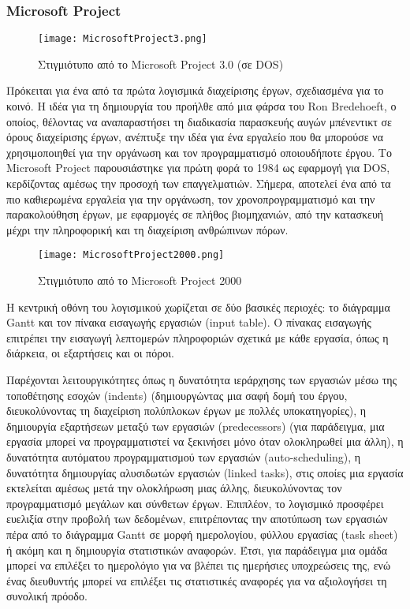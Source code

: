             \subsubsection{Microsoft Project}
                \begin{figure}[h!] \noindent \centering
                    \texttt{[image: MicrosoftProject3.png]}
                    \caption{\centering Στιγμιότυπο από το Microsoft Project 3.0 (σε DOS) \cite{WinWorld}}
                    \label{fig:MicrosoftProject3}
                \end{figure}

                Πρόκειται για ένα από τα πρώτα λογισμικά διαχείρισης έργων, σχεδιασμένα για το κοινό. Η ιδέα για τη δημιουργία του προήλθε από μια φάρσα του Ron Bredehoeft, ο οποίος, θέλοντας να αναπαραστήσει τη διαδικασία παρασκευής αυγών μπένεντικτ σε όρους διαχείρισης έργων, ανέπτυξε την ιδέα για ένα εργαλείο που θα μπορούσε να χρησιμοποιηθεί για την οργάνωση και τον προγραμματισμό οποιουδήποτε έργου. Το Microsoft Project παρουσιάστηκε για πρώτη φορά το 1984 ως εφαρμογή για DOS, κερδίζοντας αμέσως την προσοχή των επαγγελματιών. Σήμερα, αποτελεί ένα από τα πιο καθιερωμένα εργαλεία για την οργάνωση, τον χρονοπρογραμματισμό και την παρακολούθηση έργων, με εφαρμογές σε πλήθος βιομηχανιών, από την κατασκευή μέχρι την πληροφορική και τη διαχείριση ανθρώπινων πόρων.

                \begin{figure}[h!] \noindent \centering
                    \texttt{[image: MicrosoftProject2000.png]}
                    \caption{\centering Στιγμιότυπο από το Microsoft Project 2000 \cite{WinWorld}}
                    \label{fig:MicrosoftProject2000}
                \end{figure}

                Η κεντρική οθόνη του λογισμικού χωρίζεται σε δύο βασικές περιοχές: το διάγραμμα Gantt και τον πίνακα εισαγωγής εργασιών (input table). Ο πίνακας εισαγωγής επιτρέπει την εισαγωγή λεπτομερών πληροφοριών σχετικά με κάθε εργασία, όπως η διάρκεια, οι εξαρτήσεις και οι πόροι.

                Παρέχονται λειτουργικότητες όπως η δυνατότητα ιεράρχησης των εργασιών μέσω της τοποθέτησης εσοχών (indents) (δημιουργώντας μια σαφή δομή του έργου, διευκολύνοντας τη διαχείριση πολύπλοκων έργων με πολλές υποκατηγορίες), η δημιουργία εξαρτήσεων μεταξύ των εργασιών (predecessors) (για παράδειγμα, μια εργασία μπορεί να προγραμματιστεί να ξεκινήσει μόνο όταν ολοκληρωθεί μια άλλη), η δυνατότητα αυτόματου προγραμματισμού των εργασιών (auto-scheduling), η δυνατότητα δημιουργίας αλυσιδωτών εργασιών (linked tasks), στις οποίες μια εργασία εκτελείται αμέσως μετά την ολοκλήρωση μιας άλλης, διευκολύνοντας τον προγραμματισμό μεγάλων και σύνθετων έργων. Επιπλέον, το λογισμικό προσφέρει ευελιξία στην προβολή των δεδομένων, επιτρέποντας την αποτύπωση των εργασιών πέρα από το διάγραμμα Gantt σε μορφή ημερολογίου, φύλλου εργασίας (task sheet) ή ακόμη και η δημιουργία στατιστικών αναφορών. Έτσι, για παράδειγμα μια ομάδα μπορεί να επιλέξει το ημερολόγιο για να βλέπει τις ημερήσιες υποχρεώσεις της, ενώ ένας διευθυντής μπορεί να επιλέξει τις στατιστικές αναφορές για να αξιολογήσει τη συνολική πρόοδο.

